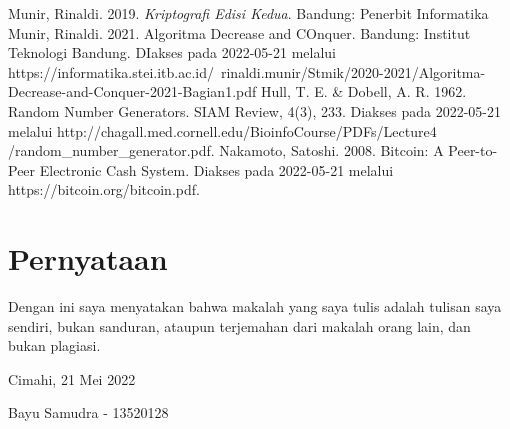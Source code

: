 \documentclass[10pt,conference]{IEEEtran}
\theoremstyle{definition}
\begin{document}
\begin{thebibliography}{00}
 Munir, Rinaldi. 2019. \emph{Kriptografi Edisi Kedua}. Bandung: Penerbit Informatika 
 Munir, Rinaldi. 2021. Algoritma Decrease and COnquer. Bandung: Institut Teknologi Bandung. DIakses pada 2022-05-21 melalui https://informatika.stei.itb.ac.id/~rinaldi.munir/Stmik/2020-2021/Algoritma-Decrease-and-Conquer-2021-Bagian1.pdf
 Hull, T. E. \& Dobell, A. R. 1962. Random Number Generators. SIAM Review, 4(3), 233. Diakses pada 2022-05-21 melalui http://chagall.med.cornell.edu/BioinfoCourse/PDFs/Lecture4\\
/random\_number\_generator.pdf.
 Nakamoto, Satoshi. 2008. Bitcoin: A Peer-to-Peer Electronic Cash System. Diakses pada 2022-05-21 melalui https://bitcoin.org/bitcoin.pdf.
\end{thebibliography}

\section*{Pernyataan}
Dengan ini saya menyatakan bahwa makalah yang saya tulis adalah tulisan saya sendiri, bukan sanduran, ataupun terjemahan dari makalah orang lain, dan bukan plagiasi.


\vspace{20px}
\hspace*{\fill} Cimahi, 21 Mei 2022

\vspace{50px}
\hspace*{\fill} Bayu Samudra - 13520128
\end{document}
